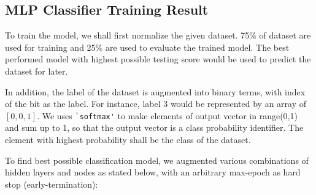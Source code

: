 \documentclass{tron}
\begin{document}
\subsection{MLP Classifier Training Result}
To train the model, we shall first normalize the given dataset. 75\% of dataset are used for training and 25\% are used to evaluate the trained model. The best performed model with highest possible testing score would be used to predict the dataset for  later.

In addition, the label of the dataset is augmented into binary terms, with index of the bit as the label. For instance, label 3 would be represented by an array of $[0,0,1]$. We uses \verb|`softmax'| to make elements of output vector in range(0,1) and sum up to 1, so that the output vector is a class probability identifier. The element with highest probability shall be the class of the dataset.

To find best possible classification model, we augmented various combinations of hidden layers and nodes as stated below, with an arbitrary max-epoch as hard stop (early-termination):


\end{document}
